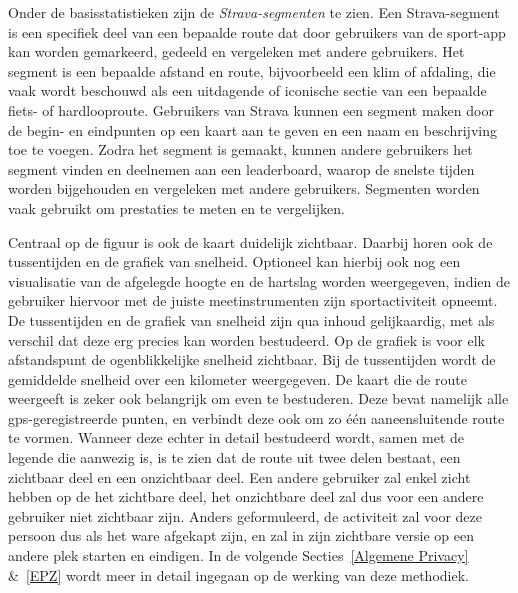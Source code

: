 Onder de basisstatistieken zijn de \textit{Strava-segmenten} te zien. Een
Strava-segment is een specifiek deel van een bepaalde route dat door gebruikers
van de sport-app kan worden gemarkeerd, gedeeld en vergeleken met andere
gebruikers. Het segment is een bepaalde afstand en route, bijvoorbeeld een klim
of afdaling, die vaak wordt beschouwd als een uitdagende of iconische sectie
van een bepaalde fiets- of hardlooproute. Gebruikers van Strava kunnen een
segment maken door de begin- en eindpunten op een kaart aan te geven en een
naam en beschrijving toe te voegen. Zodra het segment is gemaakt, kunnen andere
gebruikers het segment vinden en deelnemen aan een leaderboard, waarop de
snelste tijden worden bijgehouden en vergeleken met andere gebruikers.
Segmenten worden vaak gebruikt om prestaties te meten en te vergelijken.

Centraal op de figuur is ook de kaart duidelijk zichtbaar. Daarbij horen ook de
tussentijden en de grafiek van snelheid. Optioneel kan hierbij ook nog een
visualisatie van de afgelegde hoogte en de hartslag worden weergegeven, indien
de gebruiker hiervoor met de juiste meetinstrumenten zijn sportactiviteit
opneemt. De tussentijden en de grafiek van snelheid zijn qua inhoud
gelijkaardig, met als verschil dat deze erg precies kan worden bestudeerd. Op
de grafiek is voor elk afstandspunt de ogenblikkelijke snelheid zichtbaar. Bij
de tussentijden wordt de gemiddelde snelheid over een kilometer weergegeven. De
kaart die de route weergeeft is zeker ook belangrijk om even te bestuderen.
Deze bevat namelijk alle \ac{gps}-geregistreerde punten, en verbindt deze ook
om zo één aaneensluitende route te vormen. Wanneer deze echter in detail
bestudeerd wordt, samen met de legende die aanwezig is, is te zien dat de route
uit twee delen bestaat, een zichtbaar deel en een onzichtbaar deel. Een andere
gebruiker zal enkel zicht hebben op de het zichtbare deel, het onzichtbare deel
zal dus voor een andere gebruiker niet zichtbaar zijn. Anders geformuleerd, de
activiteit zal voor deze persoon dus als het ware afgekapt zijn, en zal in zijn
zichtbare versie op een andere plek starten en eindigen. In de volgende
Secties~\ref{Algemene Privacy} \&~\ref{EPZ} wordt meer in detail ingegaan op de
werking van deze methodiek.

